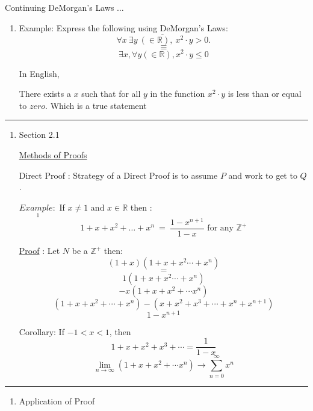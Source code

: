 \documentclass[10pt,letterpaper]{article}
\begin{document}
{
Continuing DeMorgan's Laws $\ldots$
\begin{enumerate}
    \item[]
    Example: Express the following using DeMorgan's Laws:
    $$ \overline{\forall x \ \exists y \ (\in \mathbb{R}), \ x^{2} \cdot y > 0}. $$
    $$\equiv$$
    $$\exists x , \forall y (\in \mathbb{R}), x^{2} \cdot y \leq 0$$
    
    \par In English,
    \begin{center}
            \par There exists a $x$ such that for all $y$ in the function $x^{2} \cdot y $ is less than or equal to $zero$.
     Which is a true statement \checkmark
    \end{center}
\end{enumerate}
\hrule
    
    
    
\newpage{}
\begin{enumerate}
    \item[]
    Section 2.1
    \begin{center}
                \underline{Methods of Proofs} \vspace{.5em}
    \end{center}
    
    Direct Proof : \hfill Strategy of a Direct Proof is to assume $P$ and work to get to $Q$.
    
    
    $\underset{1}{Example:}$ \quad If $x\not= 1$ and $x \in \mathbb{R}$ then : $$ 1 + x + x^{2} + \dotsc + x^{n}  \ = \ \frac{1-x^{n+1}}{1-x} \text{ for any } \mathbb{Z}^{+}$$

    \underline{Proof} : Let $N$  be a $\mathbb{Z}^{+}$ then:
        $$(1+x) (1+x+x^{2} \cdots + x^{n})$$
        $$=$$
        $$1 ( 1 + x+ x^{2} \cdots + x^{n})$$
        $$-x(1+x+x^{2}+ \cdots x^{n})$$
        $$(1+x+x^{2}+\cdots+x^{n})-(x+x^{2}+x^{3}+ \cdots + x^{n} + x^{n+1})$$
        $$1 - x^{n+1}$$
        
        Corollary: If $-1 < x < 1$, then $$1 + x +x^{2}+x^{3} + \cdots = \frac{1}{1-x}$$
        $$\lim_{n\to\infty} (1 + x + x^{2} + \cdots x^{n}) \rightarrow \sum^{\infty}_{n=0} x^{n} $$     
\end{enumerate}
\hrule

\begin{enumerate}
    \item [] Application of Proof
    \vspace{1em}
    

\end{enumerate}}
\end{document}

